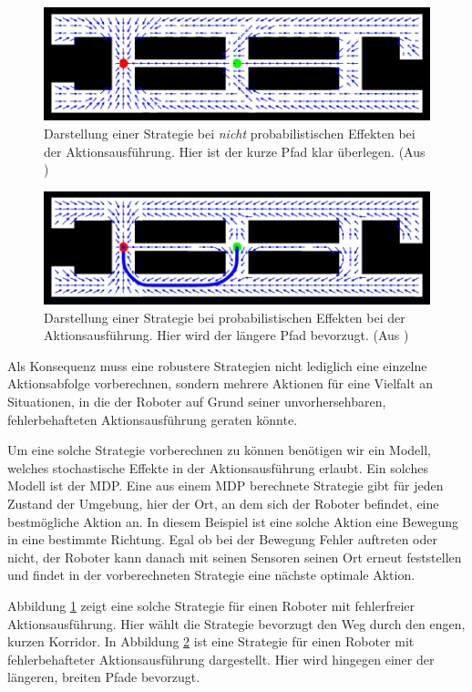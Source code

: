 \documentclass[a4paper]{IEEEtran}
\begin{document}
\begin{figure}[ht]
	\centering
	\includegraphics[scale=0.72]{images/autnmRobot_detActionMDP.png}
	\caption{Darstellung einer Strategie bei \emph{nicht} probabilistischen Effekten bei der Aktionsausführung. Hier ist der kurze Pfad klar überlegen. (Aus \cite{thrun2005probabilistic})}
	\label{autnmRobot_detA}
\end{figure}
\begin{figure}
	\includegraphics[scale=0.72]{images/autnmRobot_ndetActionMDP.png}
	\caption{Darstellung einer Strategie bei probabilistischen Effekten bei der Aktionsausführung. Hier wird der längere Pfad bevorzugt. (Aus \cite{thrun2005probabilistic})}
	\label{autnmRobot_ndetA}
\end{figure}

Als Konsequenz muss eine robustere Strategien nicht lediglich eine einzelne Aktionsabfolge vorberechnen, sondern mehrere Aktionen für eine Vielfalt an Situationen, in die der Roboter auf Grund seiner unvorhersehbaren, fehlerbehafteten Aktionsausführung geraten könnte.

Um eine solche Strategie vorberechnen zu können benötigen wir ein Modell, welches stochastische Effekte in der Aktionsausführung erlaubt. Ein solches Modell ist der MDP. Eine aus einem MDP berechnete Strategie gibt für jeden Zustand der Umgebung, hier der Ort, an dem sich der Roboter befindet, eine bestmögliche Aktion an. In diesem Beispiel ist eine solche Aktion eine Bewegung in eine bestimmte Richtung. Egal ob bei der Bewegung Fehler auftreten oder nicht, der Roboter kann danach mit seinen Sensoren seinen Ort erneut feststellen und findet in der vorberechneten Strategie eine nächste optimale Aktion.

Abbildung \ref{autnmRobot_detA} zeigt eine solche Strategie für einen Roboter mit fehlerfreier Aktionsausführung. Hier wählt die Strategie bevorzugt den Weg durch den engen, kurzen Korridor. In Abbildung \ref{autnmRobot_ndetA} ist eine Strategie für einen Roboter mit fehlerbehafteter Aktionsausführung dargestellt. Hier wird hingegen einer der längeren, breiten Pfade bevorzugt.
\end{document}
